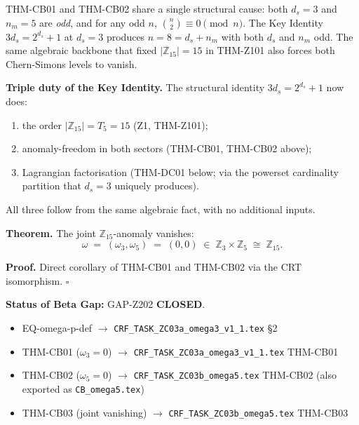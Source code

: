 \documentclass[12pt, a4paper]{article}
\begin{document}
\begin{keybox}[title={The Common Mechanism: Odd $n$ and Binomial Parity}]
THM-CB01 and THM-CB02 share a single structural cause: both $d_s = 3$
and $n_m = 5$ are \emph{odd}, and for any odd $n$,
$\binom{n}{2} \equiv 0 \pmod n$. The Key Identity
$3 d_s = 2^{d_s} + 1$ at $d_s = 3$ produces $n = 8 = d_s + n_m$ with
both $d_s$ and $n_m$ odd. The same algebraic backbone that fixed
$|\mathbb{Z}_{15}| = 15$ in THM-Z101 also forces both Chern-Simons
levels to vanish.

\textbf{Triple duty of the Key Identity.} The structural identity
$3 d_s = 2^{d_s} + 1$ now does:
\begin{enumerate}[leftmargin=*]
\item the order $|\mathbb{Z}_{15}| = T_5 = 15$ (Z1, THM-Z101);
\item anomaly-freedom in both sectors (THM-CB01, THM-CB02 above);
\item Lagrangian factorisation (THM-DC01 below; via the powerset
  cardinality partition that $d_s = 3$ uniquely produces).
\end{enumerate}
All three follow from the same algebraic fact, with no additional
inputs.
\end{keybox}

\begin{formalbox}[title={THM-CB03: Joint $\omega = (0, 0)
  \in \mathbb{Z}_{15}$ (closes GAP-Z202)}]
\textbf{Theorem.} The joint $\mathbb{Z}_{15}$-anomaly vanishes:
\begin{equation}
  \omega \;=\; (\omega_3, \omega_5) \;=\; (0, 0) \;\in\; \mathbb{Z}_3 \times \mathbb{Z}_5
  \;\cong\; \mathbb{Z}_{15}.
  \label{eq:THM-CB03}
\end{equation}

\textbf{Proof.} Direct corollary of THM-CB01 and THM-CB02 via the
CRT isomorphism. \hfill$\square$

\textbf{Status of Beta Gap:} GAP-Z202 \textbf{CLOSED}.
\end{formalbox}

\begin{formalbox}[title={Source Trace --- Anomaly Section}]
\begin{itemize}[leftmargin=*]
\item EQ-omega-p-def $\to$ \texttt{CRF\_TASK\_ZC03a\_omega3\_v1\_1.tex} \S2
\item THM-CB01 ($\omega_3 = 0$) $\to$ \texttt{CRF\_TASK\_ZC03a\_omega3\_v1\_1.tex} THM-CB01
\item THM-CB02 ($\omega_5 = 0$) $\to$ \texttt{CRF\_TASK\_ZC03b\_omega5.tex} THM-CB02
  (also exported as \texttt{CB\_omega5.tex})
\item THM-CB03 (joint vanishing) $\to$ \texttt{CRF\_TASK\_ZC03b\_omega5.tex} THM-CB03
\end{itemize}
\end{formalbox}
\end{document}
